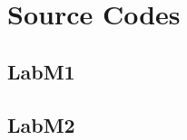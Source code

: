 \documentclass{article}
\begin{document}

\section{Source Codes}

\subsection{LabM1}


\subsection{LabM2}


\end{document}
